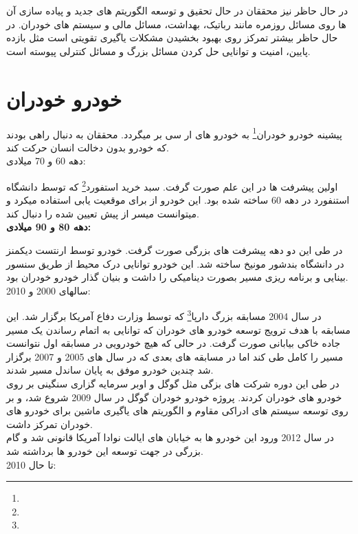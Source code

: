 \documentclass[12pt,a4paper]{report}
\begin{document}
در حال حاظر نیز محققان در حال تحقیق و توسعه الگوریتم های جدید و پیاده سازی آن ها روی مسائل روزمره مانند رباتیک، بهداشت، مسائل مالی و سیستم های خودران. در حال حاظر بیشتر تمرکز روی بهبود بخشیدن مشکلات یاگیری تقویتی است مثل بازده پایین، امنیت و توانایی حل کردن مسائل بزرگ و مسائل کنترلی پیوسته است.	
	\section{خودرو خودران}
	پیشینه خودرو خودران\footnote{} به خودرو های ار سی بر میگردد. محققان به دنبال راهی بودند که خودرو بدون دخالت انسان حرکت کند.\\
	دهه 60 و 70 میلادی:
	
	اولین پیشرفت ها در این علم صورت گرفت. سبد خرید استفورد\footnote{} که توسط دانشگاه استنفورد در دهه 60 ساخته شده بود. این خودرو از برای موقعیت یابی استفاده میکرد و میتوانست میسر از پیش تعیین شده را دنبال کند.\\
	\textbf{دهه 80 و 90 میلادی:}
	
	در طی این دو دهه پیشرفت های بزرگی صورت گرفت. خودرو  توسط ارنتست دیکمنز در دانشگاه بندشور مونیخ ساخته شد. این خودرو توانایی درک محیط از طریق سنسور بینایی و برنامه ریزی مسیر بصورت دینامیکی را داشت و بنیان گذار خودرو خودران بود.\\
	سالهای 2000 و 2010:
	
	در سال 2004 مسابقه بزرگ دارپا\footnote{} که توسط وزارت دفاع آمریکا برگزار شد. این مسابقه با هدف ترویج توسعه خودرو های خودران  که توانایی به اتمام رساندن یک مسیر جاده خاکی بیابانی صورت گرفت. در حالی که هیچ خودرویی در مسابقه اول نتوانست مسیر را کامل طی کند اما در مسابقه های بعدی که در سال های 2005 و 2007 برگزار شد چندین خودرو موفق به پایان ساندل مسیر شدند.\\
	در طی این دوره شرکت های بزگی مثل گوگل و اوبر سرمایه گزاری سنگینی بر روی خودرو های خودران کردند. پروژه خودرو خودران گوگل در سال 2009 شروع شد، و بر روی توسعه سیستم های ادراکی مقاوم و الگوریتم های یاگیری ماشین برای خودرو های خودران تمرکز داشت.\\
	در سال 2012 ورود این خودرو ها به خیابان های ایالت نوادا آمریکا قانونی شد و گام بزرگی در جهت توسعه این خودرو ها برداشته شد.\\
	2010 تا حال:
	
\end{document}

